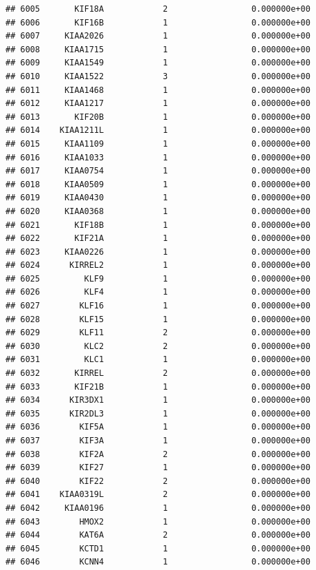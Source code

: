 \documentclass[
]{article}
\begin{document}
\begin{verbatim}
## 6005       KIF18A            2                 0.000000e+00
## 6006       KIF16B            1                 0.000000e+00
## 6007     KIAA2026            1                 0.000000e+00
## 6008     KIAA1715            1                 0.000000e+00
## 6009     KIAA1549            1                 0.000000e+00
## 6010     KIAA1522            3                 0.000000e+00
## 6011     KIAA1468            1                 0.000000e+00
## 6012     KIAA1217            1                 0.000000e+00
## 6013       KIF20B            1                 0.000000e+00
## 6014    KIAA1211L            1                 0.000000e+00
## 6015     KIAA1109            1                 0.000000e+00
## 6016     KIAA1033            1                 0.000000e+00
## 6017     KIAA0754            1                 0.000000e+00
## 6018     KIAA0509            1                 0.000000e+00
## 6019     KIAA0430            1                 0.000000e+00
## 6020     KIAA0368            1                 0.000000e+00
## 6021       KIF18B            1                 0.000000e+00
## 6022       KIF21A            1                 0.000000e+00
## 6023     KIAA0226            1                 0.000000e+00
## 6024      KIRREL2            1                 0.000000e+00
## 6025         KLF9            1                 0.000000e+00
## 6026         KLF4            1                 0.000000e+00
## 6027        KLF16            1                 0.000000e+00
## 6028        KLF15            1                 0.000000e+00
## 6029        KLF11            2                 0.000000e+00
## 6030         KLC2            2                 0.000000e+00
## 6031         KLC1            1                 0.000000e+00
## 6032       KIRREL            2                 0.000000e+00
## 6033       KIF21B            1                 0.000000e+00
## 6034      KIR3DX1            1                 0.000000e+00
## 6035      KIR2DL3            1                 0.000000e+00
## 6036        KIF5A            1                 0.000000e+00
## 6037        KIF3A            1                 0.000000e+00
## 6038        KIF2A            2                 0.000000e+00
## 6039        KIF27            1                 0.000000e+00
## 6040        KIF22            2                 0.000000e+00
## 6041    KIAA0319L            2                 0.000000e+00
## 6042     KIAA0196            1                 0.000000e+00
## 6043        HMOX2            1                 0.000000e+00
## 6044        KAT6A            2                 0.000000e+00
## 6045        KCTD1            1                 0.000000e+00
## 6046        KCNN4            1                 0.000000e+00

\end{verbatim}
\end{document}
